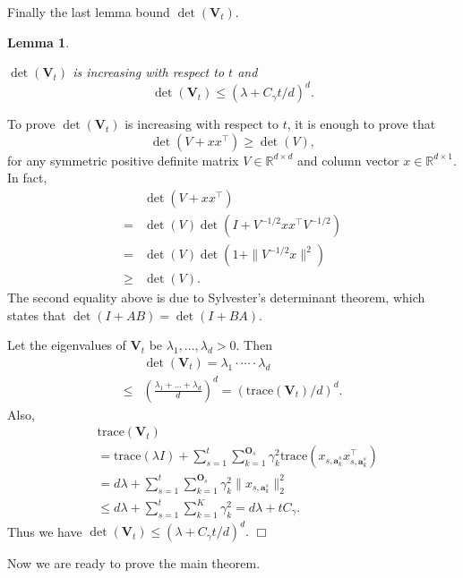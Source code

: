 \documentclass{article}
\newcommand{\RR}{\mathbb{R}}
\newcommand{\ba}{\mathbf{a}}
\newcommand{\bO}{\mathbf{O}}
\newcommand{\bV}{\mathbf{V}}
\newcommand{\trace}{\mathrm{trace}}
\newcommand{\norm}[1]{\| #1 \|}
\newtheorem{lemma}[theorem]{Lemma}%
\newenvironment{proof}{\noindent {\textbf{Proof. }}}{$\Box$ \medskip}
\newcommand{\CLemmaDetVt}{
  $\det(\bV_t)$ is increasing with respect to $t$ and 
  $$
    \det(\bV_t) \leq (\lambda + C_\gamma t/d)^d.
  $$
}
\begin{document}
Finally the last lemma bound $\det(\bV_t)$.

\begin{lemma} %
	\label{lem:detVt}
	\CLemmaDetVt
\end{lemma}
\begin{proof}
	To prove $\det(\bV_t)$ is increasing with respect to $t$, it is enough to prove that
	$$
	\det(V + xx^{\top}) \geq \det(V),
	$$
	for any symmetric positive definite matrix $V \in \RR^{d \times d}$ and column vector $x \in \RR^{d\times 1}$. In fact,
	\begin{align*}
	&\det(V + xx^{\top}) \\
	=& \det(V) \det(I + V^{-1/2}x x^{\top} V^{-1/2})\\
	=& \det(V) \det(1 + \norm{V^{-1/2}x}^2)\\
	\geq &\det(V).
	\end{align*}
	The second equality above is due to Sylvester's determinant theorem, which states that $\det(I + AB) = \det(I +BA)$.
	
	Let the eigenvalues of $\bV_t$ be $\lambda_1, \ldots, \lambda_d > 0$. Then
	\begin{align*}
	&\det(\bV_t) = \lambda_1 \cdot \cdots \cdot \lambda_d \\
	\leq & \left( \frac{\lambda_1 + \ldots + \lambda_d}{d} \right)^d = (\trace(\bV_t)/d)^d.
	\end{align*}
	Also,
	\begin{align*}
	&\trace(\bV_t)\\
	& = \trace(\lambda I) + \sum_{s=1}^t \sum_{k=1}^{\bO_s} \gamma_k^2 \trace(x_{s,\ba_k^s} x_{s,\ba_k^s}^{\top})\\	
	& = d \lambda + \sum_{s=1}^t \sum_{k=1}^{\bO_s} \gamma_k^2 \norm{x_{s,\ba_k^s}}_2^2\\
	& \leq d \lambda + \sum_{s=1}^t\sum_{k=1}^{K}\gamma_k^2 = d \lambda + t C_\gamma.
	\end{align*}
	Thus we have $\det(\bV_t) \leq (\lambda + C_\gamma t/d)^d.$
\end{proof}

Now we are ready to prove the main theorem.
\end{document}
